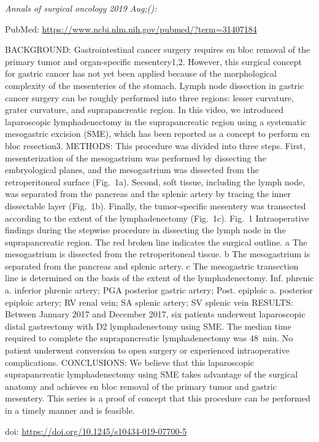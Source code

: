 \documentclass[]{article}
\begin{document}
\emph{Annals of surgical oncology 2019 Aug;():}

PubMed: \url{https://www.ncbi.nlm.nih.gov/pubmed/?term=31407184}

BACKGROUND: Gastrointestinal cancer surgery requires en bloc removal of
the primary tumor and organ-specific mesentery1,2. However, this
surgical concept for gastric cancer has not yet been applied because of
the morphological complexity of the mesenteries of the stomach. Lymph
node dissection in gastric cancer surgery can be roughly performed into
three regions: lesser curvature, grater curvature, and suprapancreatic
region. In this video, we introduced laparoscopic lymphadenectomy in the
suprapancreatic region using a systematic mesogastric excision (SME),
which has been reported as a concept to perform en bloc resection3.
METHODS: This procedure was divided into three steps. First,
mesenterization of the mesogastrium was performed by dissecting the
embryological planes, and the mesogastrium was dissected from the
retroperitoneal surface (Fig.~1a). Second, soft tissue, including the
lymph node, was separated from the pancreas and the splenic artery by
tracing the inner dissectable layer (Fig.~1b). Finally, the
tumor-specific mesentery was transected according to the extent of the
lymphadenectomy (Fig.~1c). Fig.~1 Intraoperative findings during the
stepwise procedure in dissecting the lymph node in the suprapancreatic
region. The red broken line indicates the surgical outline. a The
mesogastrium is dissected from the retroperitoneal tissue. b The
mesogastrium is separated from the pancreas and splenic artery. c The
mesogastric transection line is determined on the basis of the extent of
the lymphadenectomy. Inf. phrenic a. inferior phrenic artery; PGA
posterior gastric artery; Post. epiploic a. posterior epiploic artery;
RV renal vein; SA splenic artery; SV splenic vein RESULTS: Between
January 2017 and December 2017, six patients underwent laparoscopic
distal gastrectomy with D2 lymphadenectomy using SME. The median time
required to complete the suprapancreatic lymphadenectomy was 48~min. No
patient underwent conversion to open surgery or experienced
intraoperative complications. CONCLUSIONS: We believe that this
laparoscopic suprapancreatic lymphadenectomy using SME takes advantage
of the surgical anatomy and achieves en bloc removal of the primary
tumor and gastric mesentery. This series is a proof of concept that this
procedure can be performed in a timely manner and is feasible.

doi: \url{https://doi.org/10.1245/s10434-019-07700-5}
\end{document}
